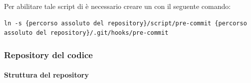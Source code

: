Per abilitare tale script di  è necessario creare un  con il seguente comando:
\begin{lstlisting}
ln -s {percorso assoluto del repository}/script/pre-commit {percorso assoluto del repository}/.git/hooks/pre-commit
\end{lstlisting}



\subsubsection{Repository del codice}

\paragraph{Struttura del repository}
	

